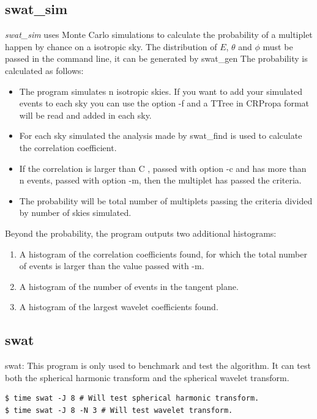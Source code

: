 \documentclass[12pt]{article}
\begin{document}
\subsection{swat\_sim}
{\it swat\_sim} uses Monte Carlo simulations to calculate the probability of a
multiplet happen by chance on a isotropic sky. The distribution of $E$, $\theta$
and $\phi$ must be passed in the command line, it can be generated by swat\_gen The
probability is calculated as follows: 
\begin{itemize}
\item The program simulates n isotropic skies. If you want to add your simulated events
to each sky you can use the option -f and a TTree in CRPropa format will be read
and added in each sky.
\item For each sky simulated the analysis made by swat\_find is used to calculate the
correlation coefficient. 
\item If the correlation is larger than C , passed with option -c and has more than n events, passed 
with option -m, then the multiplet has passed the criteria.
\item The probability will be total number of multiplets passing the criteria divided by 
number of skies simulated.
\end{itemize}

Beyond the probability, the program outputs two additional histograms:
\begin{enumerate}
\item A histogram of the correlation coefficients found, for which the total number
of events is larger than the value passed with -m.
\item A histogram of the number of events in the tangent plane.
\item A histogram of the largest wavelet coefficients found.
\end{enumerate}

\subsection{swat}
swat: This program is only used to benchmark and test the algorithm. It can test
both the spherical harmonic transform and the spherical wavelet transform.
{\bf \color{brown}
\begin{lstlisting}
$ time swat -J 8 # Will test spherical harmonic transform.
$ time swat -J 8 -N 3 # Will test wavelet transform.
\end{lstlisting}
}

\appendix
\end{document}
